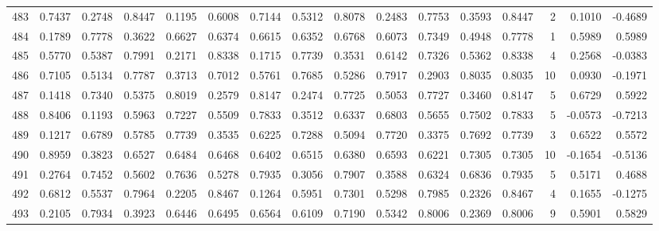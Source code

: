 \begin{tabular}{lrrrrrrrrrrrrrrr}
483 &      0.7437 &  0.2748 &  0.8447 &  0.1195 &  0.6008 &  0.7144 &  0.5312 &  0.8078 &  0.2483 &  0.7753 &   0.3593 &     0.8447 &      2 &                    0.1010 &                    -0.4689 \\
484 &      0.1789 &  0.7778 &  0.3622 &  0.6627 &  0.6374 &  0.6615 &  0.6352 &  0.6768 &  0.6073 &  0.7349 &   0.4948 &     0.7778 &      1 &                    0.5989 &                     0.5989 \\
485 &      0.5770 &  0.5387 &  0.7991 &  0.2171 &  0.8338 &  0.1715 &  0.7739 &  0.3531 &  0.6142 &  0.7326 &   0.5362 &     0.8338 &      4 &                    0.2568 &                    -0.0383 \\
486 &      0.7105 &  0.5134 &  0.7787 &  0.3713 &  0.7012 &  0.5761 &  0.7685 &  0.5286 &  0.7917 &  0.2903 &   0.8035 &     0.8035 &     10 &                    0.0930 &                    -0.1971 \\
487 &      0.1418 &  0.7340 &  0.5375 &  0.8019 &  0.2579 &  0.8147 &  0.2474 &  0.7725 &  0.5053 &  0.7727 &   0.3460 &     0.8147 &      5 &                    0.6729 &                     0.5922 \\
488 &      0.8406 &  0.1193 &  0.5963 &  0.7227 &  0.5509 &  0.7833 &  0.3512 &  0.6337 &  0.6803 &  0.5655 &   0.7502 &     0.7833 &      5 &                   -0.0573 &                    -0.7213 \\
489 &      0.1217 &  0.6789 &  0.5785 &  0.7739 &  0.3535 &  0.6225 &  0.7288 &  0.5094 &  0.7720 &  0.3375 &   0.7692 &     0.7739 &      3 &                    0.6522 &                     0.5572 \\
490 &      0.8959 &  0.3823 &  0.6527 &  0.6484 &  0.6468 &  0.6402 &  0.6515 &  0.6380 &  0.6593 &  0.6221 &   0.7305 &     0.7305 &     10 &                   -0.1654 &                    -0.5136 \\
491 &      0.2764 &  0.7452 &  0.5602 &  0.7636 &  0.5278 &  0.7935 &  0.3056 &  0.7907 &  0.3588 &  0.6324 &   0.6836 &     0.7935 &      5 &                    0.5171 &                     0.4688 \\
492 &      0.6812 &  0.5537 &  0.7964 &  0.2205 &  0.8467 &  0.1264 &  0.5951 &  0.7301 &  0.5298 &  0.7985 &   0.2326 &     0.8467 &      4 &                    0.1655 &                    -0.1275 \\
493 &      0.2105 &  0.7934 &  0.3923 &  0.6446 &  0.6495 &  0.6564 &  0.6109 &  0.7190 &  0.5342 &  0.8006 &   0.2369 &     0.8006 &      9 &                    0.5901 &                     0.5829 \\

\end{tabular}
